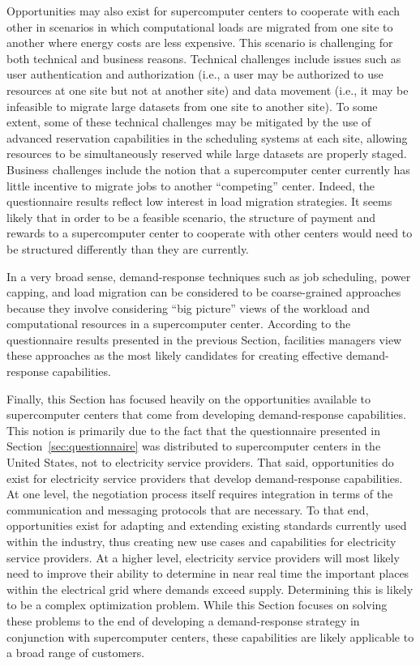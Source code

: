 Opportunities may also exist for supercomputer centers to cooperate
with each other in scenarios in which computational loads are migrated
from one site to another where energy costs are less expensive.  This
scenario is challenging for both technical and business reasons.
Technical challenges include issues such as user authentication and
authorization (i.e., a user may be authorized to use resources at one
site but not at another site) and data movement (i.e., it may be
infeasible to migrate large datasets from one site to another site).
To some extent, some of these technical challenges may be mitigated by
the use of advanced reservation capabilities in the scheduling systems
at each site, allowing resources to be simultaneously reserved while
large datasets are properly staged.  Business challenges include the
notion that a supercomputer center currently has little incentive to
migrate jobs to another ``competing'' center.  Indeed, the
questionnaire results reflect low interest in load migration
strategies.  It seems likely that in order to be a feasible scenario,
the structure of payment and rewards to a supercomputer center to
cooperate with other centers would need to be structured differently
than they are currently.

In a very broad sense, demand-response techniques such as job
scheduling, power capping, and load migration can be considered to
be coarse-grained approaches because they involve considering ``big
picture'' views of the workload and computational resources in a
supercomputer center.  According to the questionnaire results
presented in the previous Section, facilities managers view these
approaches as the most likely candidates for creating effective
demand-response capabilities.

Finally, this Section has focused heavily on the opportunities
available to supercomputer centers that come from developing
demand-response capabilities.  This notion is primarily due to the
fact that the questionnaire presented in Section~\ref{sec:questionnaire}
was distributed to supercomputer centers in the United States, not to
electricity service providers.  That said, opportunities do exist for
electricity service providers that develop demand-response
capabilities.  At one level, the negotiation process itself requires
integration in terms of the communication and messaging protocols that
are necessary.  To that end, opportunities exist for adapting and
extending existing standards currently used within the industry, thus
creating new use cases and capabilities for electricity service
providers.  At a higher level, electricity service providers will most
likely need to improve their ability to determine in near real time
the important places within the electrical grid where demands exceed
supply.  Determining this is likely to be a complex optimization
problem.  While this Section focuses on solving these problems to the
end of developing a demand-response strategy in conjunction with
supercomputer centers, these capabilities are likely applicable to a
broad range of customers.
